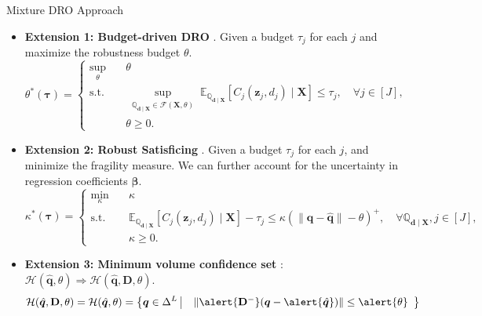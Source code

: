 \documentclass{beamer}
\newcommand{\mb}[1]{{\mathbf{#1}}}
\newcommand{\txrd}[1]{{\textcolor{sintefred}{\textbf{#1}}}}
\newcommand{\bbq}{\mathbb{Q}}
\begin{document}
\begin{frame}{Mixture DRO Approach}

\begin{itemize}
    \item \txrd{Extension 1: Budget-driven DRO} \citep{hu2025budget}. Given a budget $\tau_j$ for each $j$ and maximize the robustness budget $\theta$.
    \[
    \theta^*(\bm\tau)
    =
    \left\{
    \begin{aligned}
    \sup_{\theta} \quad & \theta \\
    \text{s.t.} \quad
    & \sup_{\substack{
    \bbq_{\bm d \mid \mb X} \in \mathcal{F}(\mb X, \theta)
    }}
    \mathbb{E}_{\bbq_{\bm d \mid \mb X}}
    \!\left[
        C_j(\bm z_j, d_j) \mid \mb X
    \right]
    \leq \tau_j,
    \quad \forall j \in [J], \\
    & \theta \ge 0 .
    \end{aligned}
    \right.
    \]

    \item \txrd{Extension 2: Robust Satisficing} \citep{sim2024analytics}. Given a budget $\tau_j$ for each $j$, and minimize the fragility measure. We can further account for the uncertainty in regression coefficients $\bm \beta$. 
    \[
    \kappa^*(\bm\tau)
    =
    \left\{
    \begin{aligned}
    \min_{\kappa} \quad & \kappa \\
    \text{s.t.} \quad
    & \mathbb{E}_{\bbq_{\bm d \mid \mb X}}
    \!\left[
        C_j(\bm z_j, d_j) \mid \mb X
    \right] - \tau_j
    \leq \kappa (\|\bm q - \hat{\bm q}\| - \theta)^+  ,
    \quad \forall  \bbq_{\bm d \mid \mb X}, j \in [J], \\
    & \kappa \ge 0 .
    \end{aligned}
    \right.
    \]

    \item \txrd{Extension 3: Minimum volume confidence set} \citep{lou2024estimation}:  $\mathcal{H}(\hat{\bm q}, \theta) \Rightarrow  \mathcal{H}(\hat{\bm q}, \mb D, \theta)$.
    \[
    \mathcal{H}(\hat{\bm q}, \mb D, \theta) =
    \mathcal{H}(\hat{\bm q}, \theta) = \left \{ \bm q \in \Delta^L \
    \begin{array}{|ll} \
        \ \|\alert{\mb D^-} (\bm q - \alert{\hat{\bm q}}) \| \leq \alert{\theta}
    \end{array}
    \right \} 
    \]

\end{itemize}

\end{frame}
\end{document}
